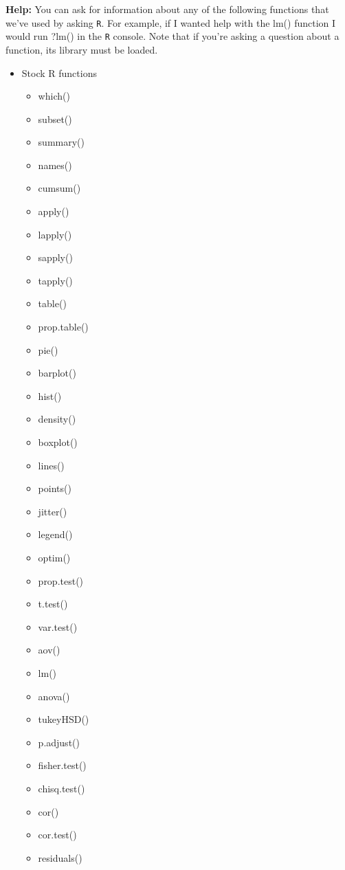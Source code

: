 \documentclass{article}
\begin{document}
\newpage
\textbf{Help:}
You can ask for information about any of the following functions that we've used by
asking \texttt{R}. For example, if I wanted help with the lm() function I would 
run ?lm() in the \texttt{R} console. Note that if you're asking a question about 
a function, its library must be loaded.\\
\begin{multicols}{3} \scriptsize
\begin{itemize}
  \item Stock R functions
  \begin{itemize}
    \item which()
    \item subset()
    \item summary()
    \item names()
    \item cumsum()
    \item apply()
    \item lapply()
    \item sapply()
    \item tapply()
    \item table()
    \item prop.table()
    \item pie()
    \item barplot()
    \item hist()
    \item density()
    \item boxplot()
    \item lines()
    \item points()
    \item jitter()
    \item legend()
    \item optim()
    \item prop.test()
    \item t.test()
    \item var.test()
    \item aov()
    \item lm()
    \item anova()
    \item tukeyHSD()
    \item p.adjust()
    \item fisher.test()
    \item chisq.test()
    \item cor()
    \item cor.test()
    \item residuals()

\end{itemize}
\end{itemize}
\end{multicols}
\end{document}
